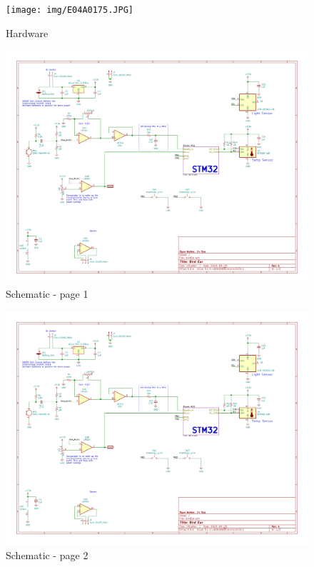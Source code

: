 \documentclass{article}
\begin{document}
\begin{figure}[H]
\centering
\texttt{[image: img/E04A0175.JPG]}
\caption{Hardware}
\label{hardware}
\end{figure}

\begin{figure}[H]
\centering
\includegraphics[scale=0.7, angle=90, page=1]{../birdEar/plot/birdEar.pdf}
\caption{Schematic - page 1}
\label{sch1}
\end{figure}

\begin{figure}[H]
\centering
\includegraphics[scale=0.7, angle=90, page=2]{../birdEar/plot/birdEar.pdf}
\caption{Schematic - page 2}
\label{sch2}
\end{figure}
\end{document}
